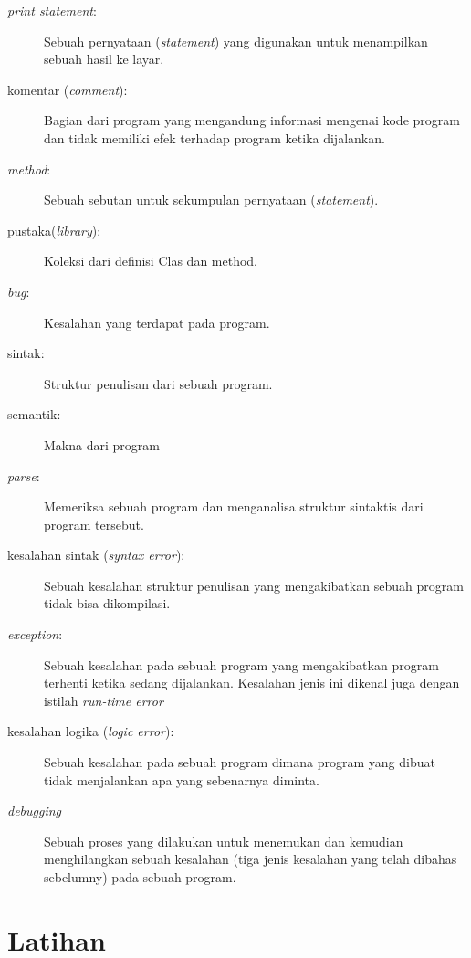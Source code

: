 \begin{description}
    \item[\textit{print statement}:] Sebuah pernyataan (\textit{statement}) yang digunakan untuk menampilkan sebuah hasil ke layar.
    \item[komentar (\textit{comment}):] Bagian dari program yang mengandung informasi mengenai kode program dan tidak memiliki efek terhadap program ketika dijalankan.
    \item[\textit{method}:] Sebuah sebutan untuk sekumpulan pernyataan (\textit{statement}).
    \item[pustaka(\textit{library}):] Koleksi dari definisi Clas dan method.
    \item[\textit{bug}:] Kesalahan yang terdapat pada program.
	\item[sintak:] Struktur penulisan dari sebuah program.
	\item[semantik:] Makna dari program
	\item[\textit{parse}:] Memeriksa sebuah program dan menganalisa struktur sintaktis dari program tersebut.
	\item[kesalahan sintak (\textit{syntax error}):] Sebuah kesalahan struktur penulisan yang mengakibatkan sebuah program tidak bisa dikompilasi.
	\item[\textit{exception}:] Sebuah kesalahan pada sebuah program yang mengakibatkan program terhenti ketika sedang dijalankan. Kesalahan jenis ini dikenal juga dengan istilah \textit{run-time error}	
	\item[kesalahan logika (\textit{logic error}):] Sebuah kesalahan pada sebuah program dimana program yang dibuat tidak menjalankan apa yang sebenarnya diminta.
	\item[\textit{debugging}] Sebuah proses yang dilakukan untuk menemukan dan kemudian menghilangkan sebuah kesalahan (tiga jenis kesalahan yang telah dibahas sebelumny) pada sebuah program.
\end{description}

	

\section{Latihan}{\tiny {\tiny {\tiny }}}